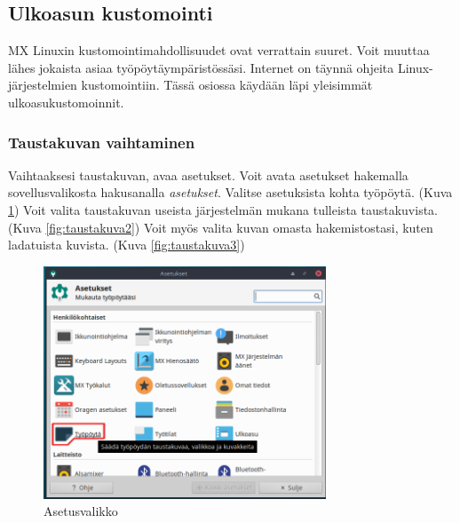 \documentclass[a4paper, 12pt, finnish]{article}
\begin{document}
\subsection{Ulkoasun kustomointi}

MX Linuxin kustomointimahdollisuudet ovat verrattain suuret. Voit muuttaa lähes jokaista asiaa työpöytäympäristössäsi. Internet on täynnä ohjeita Linux-järjestelmien kustomointiin. Tässä osiossa käydään läpi yleisimmät ulkoasukustomoinnit.

\subsubsection{Taustakuvan vaihtaminen}

Vaihtaaksesi taustakuvan, avaa asetukset. Voit avata asetukset hakemalla sovellusvalikosta hakusanalla \textit{asetukset}. Valitse asetuksista kohta työpöytä. (Kuva \ref{fig:taustakuva1}) Voit valita taustakuvan useista järjestelmän mukana tulleista taustakuvista. (Kuva \ref{fig:taustakuva2}) Voit myös valita kuvan omasta hakemistostasi, kuten ladatuista kuvista. (Kuva \ref{fig:taustakuva3})

\begin{figure}[htpb]
    \begin{center}
        \includegraphics[width=0.75\textwidth]{taustakuva}
        \caption{Asetusvalikko}
        \label{fig:taustakuva1}
    \end{center}
\end{figure}
\end{document}
